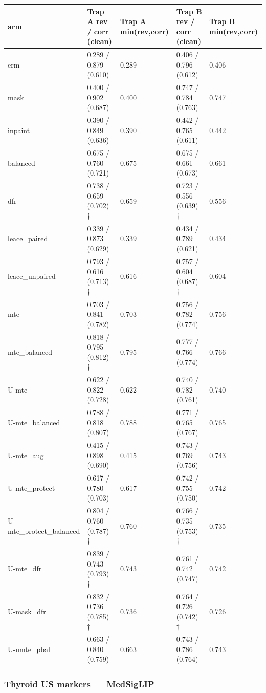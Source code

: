 {{ %
\begin{longtable}[]{@{}lllll@{}}
\toprule\noalign{}
arm & Trap A rev / corr (clean) & Trap A min(rev,corr) & Trap B rev / corr (clean) & Trap B min(rev,corr) \\
\midrule\noalign{}
\endhead
\bottomrule\noalign{}
\endlastfoot
erm & 0.289 / 0.879 (0.610) & 0.289 & 0.406 / 0.796 (0.612) & 0.406 \\
mask & 0.400 / 0.902 (0.687) & 0.400 & 0.747 / 0.784 (0.763) & 0.747 \\
inpaint & 0.390 / 0.849 (0.636) & 0.390 & 0.442 / 0.765 (0.611) & 0.442 \\
balanced & 0.675 / 0.760 (0.721) & 0.675 & 0.675 / 0.661 (0.673) & 0.661 \\
dfr & 0.738 / 0.659 (0.702) † & 0.659 & 0.723 / 0.556 (0.639) † & 0.556 \\
leace\_paired & 0.339 / 0.873 (0.629) & 0.339 & 0.434 / 0.789 (0.621) & 0.434 \\
leace\_unpaired & 0.793 / 0.616 (0.713) † & 0.616 & 0.757 / 0.604 (0.687) † & 0.604 \\
mte & 0.703 / 0.841 (0.782) & 0.703 & 0.756 / 0.782 (0.774) & 0.756 \\
mte\_balanced & 0.818 / 0.795 (0.812) † & 0.795 & 0.777 / 0.766 (0.774) & 0.766 \\
U-mte & 0.622 / 0.822 (0.728) & 0.622 & 0.740 / 0.782 (0.761) & 0.740 \\
U-mte\_balanced & 0.788 / 0.818 (0.807) & 0.788 & 0.771 / 0.765 (0.767) & 0.765 \\
U-mte\_aug & 0.415 / 0.898 (0.690) & 0.415 & 0.743 / 0.769 (0.756) & 0.743 \\
U-mte\_protect & 0.617 / 0.780 (0.703) & 0.617 & 0.742 / 0.755 (0.750) & 0.742 \\
U-mte\_protect\_balanced & 0.804 / 0.760 (0.787) † & 0.760 & 0.766 / 0.735 (0.753) † & 0.735 \\
U-mte\_dfr & 0.839 / 0.743 (0.793) † & 0.743 & 0.761 / 0.742 (0.747) & 0.742 \\
U-mask\_dfr & 0.832 / 0.736 (0.785) † & 0.736 & 0.764 / 0.726 (0.742) † & 0.726 \\
U-umte\_pbal & 0.663 / 0.840 (0.759) & 0.663 & 0.743 / 0.786 (0.764) & 0.743 \\
\end{longtable}
}

\subsubsection{Thyroid US markers --- MedSigLIP}\label{thyroid-us-markers--medsiglip}

}
